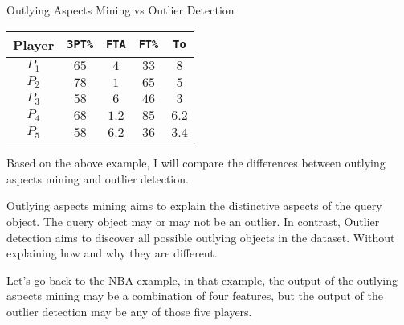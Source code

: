 \documentclass[
 size=14pt,
 paper=smartboard,  %
 mode=present, 		%
 display=slides, 	%
 style=tuliplab,  	%
 pauseslide,
 fleqn,leqno]{powerdot}
\begin{document}
\begin{slide}[toc=,bm=]{Outlying Aspects Mining vs Outlier Detection}
\begin{center}
\begin{tabular}{c| c c c c }
\toprule
Player & \texttt{3PT\%}  & \texttt{FTA} & \texttt{FT\%} & \texttt{To} \\
\midrule
$P_1$
&  {$65$} &  {$4$} &  {$33$} &  {$8$} \\
$P_2$
&  {$78$} &  {$1$}&  {$65$}&  {$5$} \\
$P_3$
&  {$58$} &  {$6$} &  {$46$} &  {$3$} \\
$P_4$
&  {$68$} &  {$1.2$}&  {$85$}&  {$6.2$} \\
$P_5$
&  {$58$} &  {$6.2$} &  {$36$} &  {$3.4$}\\
\bottomrule
\end{tabular}
\end{center}

\bigskip


\begin{note}
Based on the above example,
I will compare the differences
between outlying aspects mining and outlier detection.

Outlying aspects mining aims to
explain the distinctive aspects of the query object.
The query object may or may not be an outlier.
In contrast,
Outlier detection aims to discover all possible
outlying objects in the dataset.
Without explaining how and why they are different.

Let's go back to the NBA example,
in that example,
the output of the outlying aspects mining may be
a combination of four features,
but the output of the outlier detection may be any of those five players.
\end{note}

\end{slide}
\end{document}

